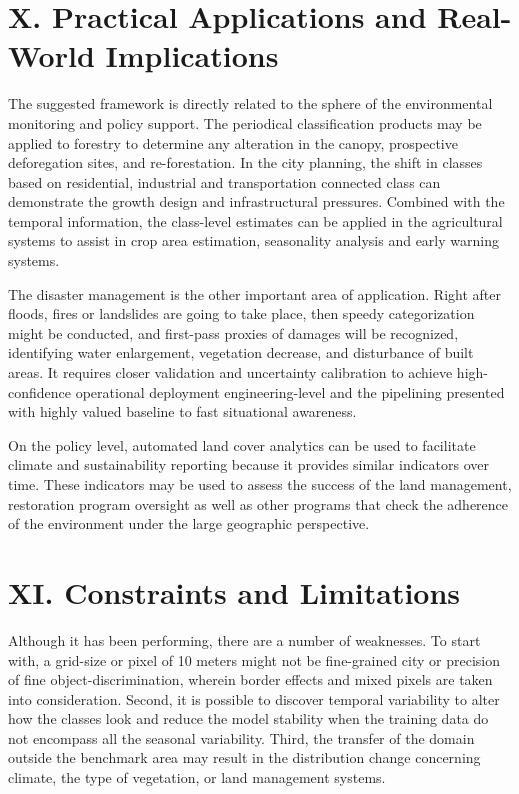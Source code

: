 ﻿\documentclass[conference]{IEEEtran}
\begin{document}
\section*{X. Practical Applications and Real-World Implications}

The suggested framework is directly related to the sphere of the environmental monitoring and policy support. The periodical classification products may be applied to forestry to determine any alteration in the canopy, prospective deforegation sites, and re-forestation. In the city planning, the shift in classes based on residential, industrial and transportation connected class can demonstrate the growth design and infrastructural pressures. Combined with the temporal information, the class-level estimates can be applied in the agricultural systems to assist in crop area estimation, seasonality analysis and early warning systems.

The disaster management is the other important area of application. Right after floods, fires or landslides are going to take place, then speedy categorization might be conducted, and first-pass proxies of damages will be recognized, identifying water enlargement, vegetation decrease, and disturbance of built areas. It requires closer validation and uncertainty calibration to achieve high-confidence operational deployment engineering-level and the pipelining presented with highly valued baseline to fast situational awareness.

On the policy level, automated land cover analytics can be used to facilitate climate and sustainability reporting because it provides similar indicators over time. These indicators may be used to assess the success of the land management, restoration program oversight as well as other programs that check the adherence of the environment under the large geographic perspective.

\section*{XI. Constraints and Limitations}

Although it has been performing, there are a number of weaknesses. To start with, a grid-size or pixel of 10 meters might not be fine-grained city or precision of fine object-discrimination, wherein border effects and mixed pixels are taken into consideration. Second, it is possible to discover temporal variability to alter how the classes look and reduce the model stability when the training data do not encompass all the seasonal variability. Third, the transfer of the domain outside the benchmark area may result in the distribution change concerning climate, the type of vegetation, or land management systems.
\end{document}
